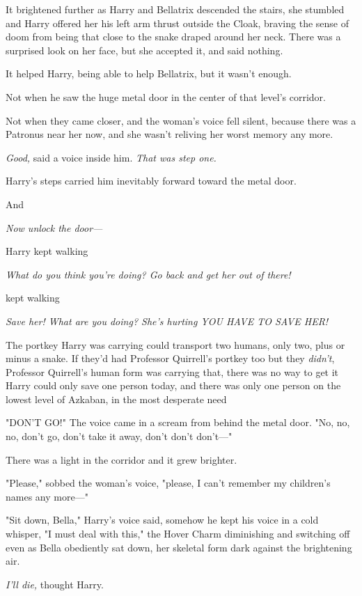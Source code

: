 It brightened further as Harry and Bellatrix descended the stairs, she stumbled
and Harry offered her his left arm thrust outside the Cloak, braving the sense
of doom from being that close to the snake draped around her neck. There was a
surprised look on her face, but she accepted it, and said nothing.

It helped Harry, being able to help Bellatrix, but it wasn't enough.

Not when he saw the huge metal door in the center of that level's corridor.

Not when they came closer, and the woman's voice fell silent, because there was
a Patronus near her now, and she wasn't reliving her worst memory any more.

\emph{Good,} said a voice inside him. \emph{That was step one.}

Harry's steps carried him inevitably forward toward the metal door.

And{\el}

\emph{Now unlock the door—}

{\el} Harry kept walking{\el}

\emph{What do you think you're doing? Go back and get her out of there!}

{\el} kept walking{\el}

\emph{Save her! What are you doing? She's hurting YOU HAVE TO SAVE HER!}

The portkey Harry was carrying could transport two humans, only two, plus or
minus a snake. If they'd had Professor Quirrell's portkey too{\el} but they
\emph{didn't}, Professor Quirrell's human form was carrying that, there was no
way to get it{\el} Harry could only save one person today, and there was
only one person on the lowest level of Azkaban, in the most desperate
need{\el}

"DON'T GO!" The voice came in a scream from behind the metal door. "No, no, no,
don't go, don't take it away, don't don't don't—"

There was a light in the corridor and it grew brighter.

"Please," sobbed the woman's voice, "please, I can't remember my children's
names any more—"

"Sit down, Bella," Harry's voice said, somehow he kept his voice in a cold
whisper, "I must deal with this," the Hover Charm diminishing and switching off
even as Bella obediently sat down, her skeletal form dark against the
brightening air.

\emph{I'll die,} thought Harry.

